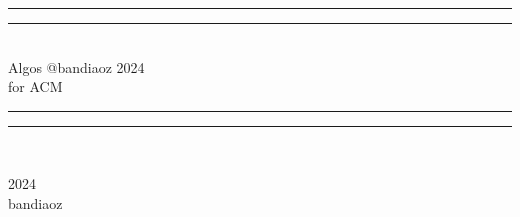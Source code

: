 \documentclass[a4paper,11pt]{ctexbook}
\begin{document}
 
  \begin{titlepage}       %
    \centering
    \vspace*{\baselineskip}
    \rule{\textwidth}{1.6pt}\vspace*{-\baselineskip}\vspace*{2pt}
    \rule{\textwidth}{0.4pt}\\[\baselineskip]
    {\LARGE Algos @bandiaoz 2024\\[\baselineskip]\small for ACM}
    \\[0.2\baselineskip]
    \rule{\textwidth}{0.4pt}\vspace*{-\baselineskip}\vspace{3.2pt}
    \rule{\textwidth}{1.6pt}\\[\baselineskip]
    \scshape

    \begin{figure}[!htb]
        \centering
    \end{figure}

    \vfill
    {\scshape 2024} \\{\large bandiaoz}\par
  \end{titlepage}
 \newpage            %
\tableofcontents     %

\setcounter{page}{1}


\end{document}
